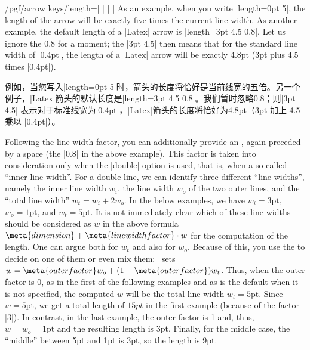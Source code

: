 \begin{key}{/pgf/arrow keys/length=| |%
        | |}
    As an example, when you write |length=0pt 5|, the length of the arrow will
    be exactly five times the current line width. As another example, the
    default length of a |Latex| arrow is |length=3pt 4.5 0.8|. Let us ignore
    the 0.8 for a moment; the |3pt 4.5| then means that for the standard line
    width of |0.4pt|, the length of a |Latex| arrow will be exactly 4.8pt (3pt
    plus 4.5 times |0.4pt|).

    例如，当您写入|length=0pt 5|时，箭头的长度将恰好是当前线宽的五倍。另一个例子，|Latex|箭头的默认长度是|length=3pt 4.5 0.8|。我们暂时忽略0.8；则|3pt 4.5| 表示对于标准线宽为|0.4pt|，|Latex|箭头的长度将恰好为4.8pt（3pt 加上 4.5 乘以 |0.4pt|）。

    Following the line width factor, you can additionally provide an
    , again preceded by a space (the |0.8| in the above
    example). This factor is taken into consideration only when the |double|
    option is used, that is, when a so-called ``inner line width''. For a
    double line, we can identify three different ``line widths'', namely the
    inner line width $w_i$, the line width  $w_o$ of the two outer lines, and
    the ``total line width'' $w_t = w_i + 2w_o$. In the below examples, we have
    $w_i = 3\mathrm{pt}$, $w_o=1\mathrm{pt}$, and $w_t = 5\mathrm{pt}$. It is
    not immediately clear which of these line widths should be considered as
    $w$ in the above formula $\meta{dimension} + \meta{line width factor}\cdot
    w$ for the computation of the length. One can argue both for $w_t$ and also
    for $w_o$. Because of this, you use the  to decide on
    one of them or even mix them: \tikzname\ sets $w = \meta{outer factor} w_o
    + (1-\meta{outer factor})w_t$. Thus, when the outer factor is $0$, as in
    the first of the following examples and as is the default when it is not
    specified, the computed $w$ will be the total line width $w_t =
    5\mathrm{pt}$. Since $w=5\mathrm{pt}$, we get a total length of $15pt$ in
    the first example (because of the factor |3|). In contrast, in the last
    example, the outer factor is 1 and, thus, $w = w_o = \mathrm{1pt}$ and the
    resulting length is 3pt. Finally, for the middle case, the ``middle''
    between 5pt and 1pt is 3pt, so the length is 9pt.


\end{key}
